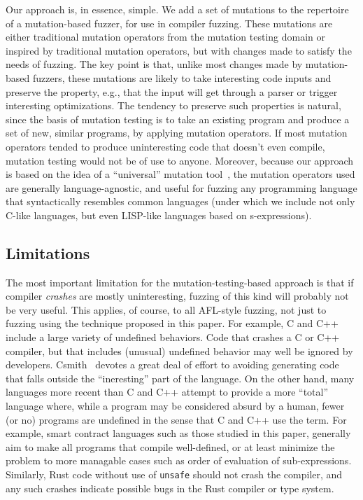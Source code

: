 Our approach is, in essence, simple.  We add a set of mutations to the repertoire of a mutation-based fuzzer, for use in compiler fuzzing.  These mutations are either traditional mutation operators from the mutation testing domain or inspired by traditional mutation operators, but with changes made to satisfy the needs of fuzzing.  The key point is that, unlike most changes made by mutation-based fuzzers, these mutations are likely to take interesting code inputs and preserve the property, e.g., that the input will get through a parser or trigger interesting optimizations.  The tendency to preserve such properties is natural, since the basis of mutation testing is to take an existing program and produce a set of new, similar programs, by applying mutation operators.  If most mutation operators tended to produce uninteresting code that doesn't even compile, mutation testing would not be of use to anyone.  Moreover, because our approach is based on the idea of a ``universal'' mutation tool~\cite{regexpMut}, the mutation operators used are generally language-agnostic, and useful for fuzzing any programming language that syntactically resembles common languages (under which we include not only C-like languages, but even LISP-like languages based on s-expressions).

\subsection{Limitations}

The most important limitation for the mutation-testing-based approach is that if compiler \emph{crashes} are mostly uninteresting, fuzzing of this kind will probably not be very useful.  This applies, of course, to all AFL-style fuzzing, not just to fuzzing using the technique proposed in this paper.  For example, C and C++ include a large variety of undefined behaviors.  Code that crashes a C or C++ compiler, but that includes (unusual) undefined behavior may well be ignored by developers.  Csmith~\cite{csmith} devotes a great deal of effort to avoiding generating code that falls outside the ``ineresting'' part of the language.  On the other hand, many languages more recent than C and C++ attempt to provide a more ``total'' language where, while a program may be considered absurd by a human, fewer (or no) programs are undefined in the sense that C and C++ use the term.  For example, smart contract languages such as those studied in this paper, generally aim to make all programs that compile well-defined, or at least minimize the problem to more managable cases such as order of evaluation of sub-expressions.  Similarly, Rust code without use of {\tt unsafe} should not crash the compiler, and any such crashes indicate possible bugs in the Rust compiler or type system.  